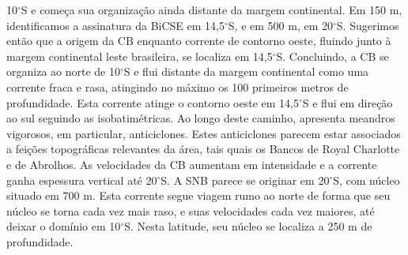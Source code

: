 10$^\circ$S e começa sua organização ainda distante da margem
continental. Em 150 m, identificamos a assinatura da BiCSE em
14,5$^\circ$S, e em 500 m, em 20$^\circ$S. Sugerimos então que a
origem da CB enquanto corrente de contorno oeste, fluindo junto à
margem continental leste brasileira, se localiza em
14,5$^\circ$S. Concluindo, a CB se organiza ao norte de 10$^\circ$S e
flui distante da margem continental como uma corrente fraca e rasa,
atingindo no máximo os 100 primeiros metros de profundidade.  Esta
corrente atinge o contorno oeste em 14,5$^\circ$S e flui em direção ao
sul seguindo as isobatimétricas. Ao longo deste caminho, apresenta
meandros vigorosos, em particular, anticiclones. Estes anticiclones
parecem estar associados a feições topográficas relevantes da área,
tais quais os Bancos de Royal Charlotte e de Abrolhos. As velocidades
da CB aumentam em intensidade e a corrente ganha espessura vertical
até 20$^\circ$S. A SNB parece se originar em 20$^\circ$S, com núcleo
situado em 700 m. Esta corrente segue viagem rumo ao norte de forma
que seu núcleo se torna cada vez mais raso, e suas velocidades cada
vez maiores, até deixar o domínio em 10$^\circ$S. Nesta latitude, seu
núcleo se localiza a 250 m de profundidade.


